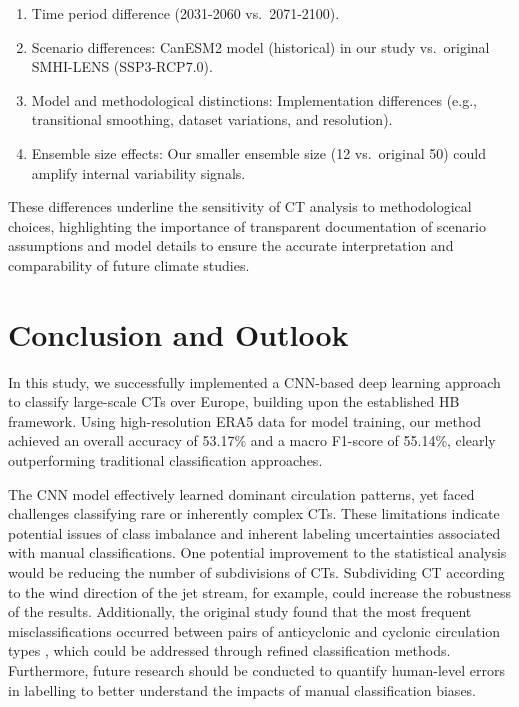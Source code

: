 \documentclass[
]{krantz}
\providecommand{\tightlist}{%
  \setlength{\itemsep}{0pt}\setlength{\parskip}{0pt}}
\begin{document}
\begin{enumerate}
\def\labelenumi{\arabic{enumi}.}
\tightlist
\item
  Time period difference (2031-2060 vs.~2071-2100).
\item
  Scenario differences: CanESM2 model (historical) in our study vs.~original SMHI-LENS (SSP3-RCP7.0).
\item
  Model and methodological distinctions: Implementation differences (e.g., transitional smoothing, dataset variations, and resolution).
\item
  Ensemble size effects: Our smaller ensemble size (12 vs.~original 50) could amplify internal variability signals.
\end{enumerate}

These differences underline the sensitivity of CT analysis to methodological choices, highlighting the importance of transparent documentation of scenario assumptions and model details to ensure the accurate interpretation and comparability of future climate studies.

\section{Conclusion and Outlook}\label{conclusion-and-outlook}

In this study, we successfully implemented a CNN-based deep learning approach to classify large-scale CTs over Europe, building upon the established HB framework. Using high-resolution ERA5 data for model training, our method achieved an overall accuracy of 53.17\% and a macro F1-score of 55.14\%, clearly outperforming traditional classification approaches.

The CNN model effectively learned dominant circulation patterns, yet faced challenges classifying rare or inherently complex CTs. These limitations indicate potential issues of class imbalance and inherent labeling uncertainties associated with manual classifications.
One potential improvement to the statistical analysis would be reducing the number of subdivisions of CTs. Subdividing CT according to the wind direction of the jet stream, for example, could increase the robustness of the results. Additionally, the original study found that the most frequent misclassifications occurred between pairs of anticyclonic and cyclonic circulation types \citep{Mittermeier2022}, which could be addressed through refined classification methods. Furthermore, future research should be conducted to quantify human-level errors in labelling to better understand the impacts of manual classification biases.
\end{document}
